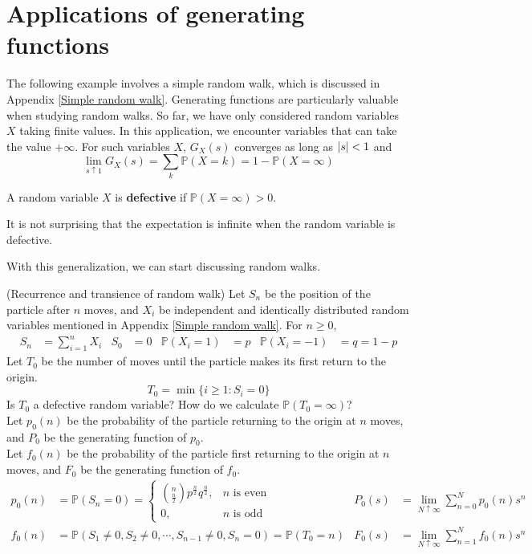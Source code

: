 \documentclass{huhtakm-template-book}
\newcommand{\prob}{\mathbb{P}}
\begin{document}
\section{Applications of generating functions}
    The following example involves a simple random walk, which is discussed in Appendix \ref{Simple random walk}. Generating functions are particularly valuable when studying random walks. So far, we have only considered random variables $X$ taking finite values. In this application, we encounter variables that can take the value $+\infty$. For such variables $X$, $G_{X}(s)$ converges as long as $\left|{s}\right|<1$ and
    \begin{equation*}
        \lim_{s\uparrow 1}G_{X}(s)=\sum_{k}\prob(X=k)=1-\prob(X=\infty)
    \end{equation*}
    \begin{defn}
        A random variable $X$ is \textbf{defective} if $\prob(X=\infty)>0$.
    \end{defn}
    \begin{rem}
        It is not surprising that the expectation is infinite when the random variable is defective.
    \end{rem}
    With this generalization, we can start discussing random walks.
    \begin{eg}(Recurrence and transience of random walk)
        \label{Simple random walk recurrence and transience}
        Let $S_{n}$ be the position of the particle after $n$ moves, and $X_{i}$ be independent and identically distributed random variables mentioned in Appendix \ref{Simple random walk}. For $n\geq 0$,
        \begin{align*}
            S_{n}&=\sum_{i=1}^{n}X_{i} & S_{0}&=0 & \prob(X_{i}=1)&=p & \prob(X_{i}=-1)&=q=1-p
        \end{align*}
        Let $T_{0}$ be the number of moves until the particle makes its first return to the origin.
        \begin{equation*}
            T_{0}=\min\{i\geq 1:S_{i}=0\}
        \end{equation*}
        Is $T_{0}$ a defective random variable? How do we calculate $\prob(T_{0}=\infty)$?\\
        Let $p_{0}(n)$ be the probability of the particle returning to the origin at $n$ moves, and $P_{0}$ be the generating function of $p_{0}$.\\
        Let $f_{0}(n)$ be the probability of the particle first returning to the origin at $n$ moves, and $F_{0}$ be the generating function of $f_{0}$.
        \begin{align*}
            p_{0}(n)&=\prob(S_{n}=0)=\begin{cases}
                \binom{n}{\frac{n}{2}}p^{\frac{n}{2}}q^{\frac{n}{2}}, &n\text{ is even}\\
                0, &n\text{ is odd}
            \end{cases} & P_{0}(s)&=\lim_{N\uparrow\infty}\sum_{n=0}^{N}p_{0}(n)s^{n}\\
            f_{0}(n)&=\prob(S_{1}\neq 0,S_{2}\neq 0,\cdots,S_{n-1}\neq 0,S_{n}=0)=\prob(T_{0}=n) & F_{0}(s)&=\lim_{N\uparrow\infty}\sum_{n=1}^{N}f_{0}(n)s^{n}
        \end{align*}
    \end{eg}
\end{document}
